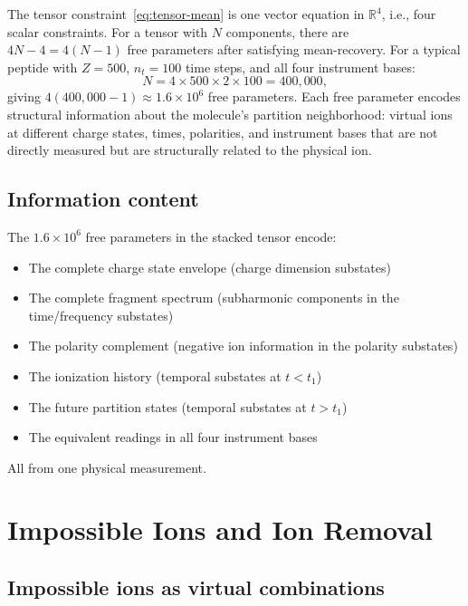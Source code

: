 \documentclass[twocolumn,10pt,a4paper]{article}
\theoremstyle{thmstyle}
\theoremstyle{definition}
\theoremstyle{remark}
\newcommand{\R}{\mathbb{R}}
\begin{document}
The tensor constraint~\eqref{eq:tensor-mean} is one vector equation in
$\R^4$, i.e., four scalar constraints. For a tensor with $N$ components,
there are $4N - 4 = 4(N-1)$ free parameters after satisfying
mean-recovery. For a typical peptide with $Z = 500$, $n_t = 100$
time steps, and all four instrument bases:
\begin{equation}
N = 4 \times 500 \times 2 \times 100 = 400{,}000,
\label{eq:N}
\end{equation}
giving $4(400{,}000 - 1) \approx 1.6 \times 10^6$ free parameters.
Each free parameter encodes structural information about the molecule's
partition neighborhood: virtual ions at different charge states, times,
polarities, and instrument bases that are not directly measured but are
structurally related to the physical ion.

\subsection{Information content}

The $1.6 \times 10^6$ free parameters in the stacked tensor encode:
\begin{itemize}[nosep]
\item The complete charge state envelope (charge dimension substates)
\item The complete fragment spectrum (subharmonic components in the
time/frequency substates)
\item The polarity complement (negative ion information in the polarity
substates)
\item The ionization history (temporal substates at $t < t_1$)
\item The future partition states (temporal substates at $t > t_1$)
\item The equivalent readings in all four instrument bases
\end{itemize}
All from one physical measurement.

\section{Impossible Ions and Ion Removal}
\label{sec:impossible}

\subsection{Impossible ions as virtual combinations}
\end{document}
